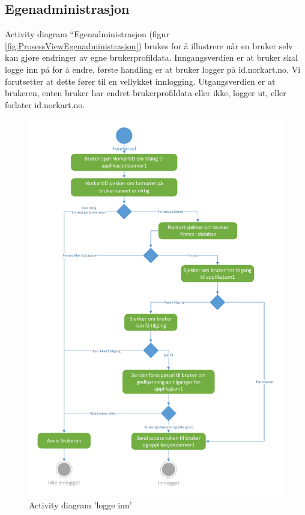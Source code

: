 \subsection{Egenadministrasjon}
\label{subsec:prosess_view_egenadministrasjon}
Activity diagram “Egenadministrasjon (figur \ref{fig:ProsessViewEgenadministrasjon}) brukes for å illustrere når en bruker selv kan gjøre endringer av egne brukerprofildata. Inngangsverdien er at bruker skal logge inn på for å endre, første handling er at bruker logger på id.norkart.no. Vi forutsetter at dette fører til en vellykket innlogging. Utgangsverdien er at brukeren, enten bruker har endret brukerprofildata eller ikke, logger ut, eller forlater id.norkart.no.
\newline

\begin{figure}[H]
\centering
    \includegraphics[scale=0.65]{graphics/04-arkitektur/ProsessViewLoggeInn}
    \caption{Activity diagram 'logge inn' }
    \label{fig:ProsessViewLoggeInn}
\end{figure}

